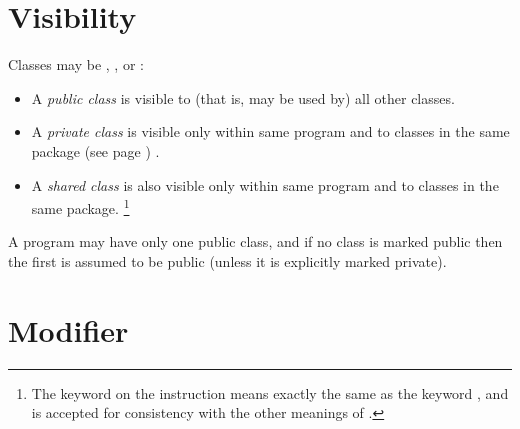 \section{Visibility}
 
Classes may be , , or
:
\begin{itemize}
\item A \emph{public class} is visible to (that is, may be used by)
all other classes.
\item A \emph{private class} is visible only within same program and to
classes in the same  package (see page \pageref{refpackage}) .
\item A \emph{shared class} is also visible only within same program and to
classes in the same package.
\footnote{
The  keyword on the  instruction means
exactly the same as the keyword , and is accepted for
consistency with the other meanings of .
}
\end{itemize}
\begin{shaded} 
A program may have only one public class, and if no class is marked
public then the first is assumed to be public (unless it is explicitly
marked private).
\end{shaded}
\section{Modifier}
 
